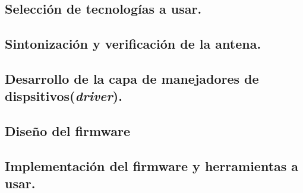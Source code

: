 
	






	
		

		
		
		
		


%




\subsection{Selección de tecnologías a usar.}

\subsection{Sintonización y verificación de la antena.}

\subsection{Desarrollo de la capa de manejadores de dispsitivos(\textit{driver}).}

\subsection{Diseño del firmware}

\subsection{Implementación del firmware  y herramientas a usar.}



